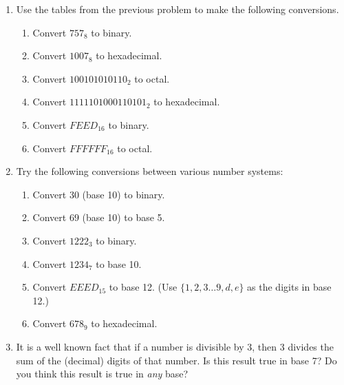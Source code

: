 \begin{enumerate}
{\vfill

}

\hintspagebreak
\workbookpagebreak
\textbookpagebreak

\item Use the tables from the previous problem to make the following conversions.

\begin{enumerate}
\item Convert $757_8$ to binary.
\item Convert $1007_8$ to hexadecimal.
\item Convert $100101010110_2$ to octal.
\item Convert $1111101000110101_2$ to hexadecimal.
\item Convert $FEED_{16}$ to binary.
\item Convert $FFFFFF_{16}$ to octal.
\end{enumerate}


\wbvfill

\item Try the following conversions between various number systems:

\begin{enumerate}
\item Convert $30$ (base 10) to binary.
\item Convert $69$ (base 10) to base 5.
\item Convert $1222_3$ to binary.
\item Convert $1234_7$ to base 10.
\item Convert $EEED_{15}$ to base 12. (Use $\{1, 2, 3 \ldots 9, d, e\}$ as the digits in base 12.)
\item Convert $678_{9}$ to hexadecimal.
\end{enumerate}

\wbvfill

\hintspagebreak
\workbookpagebreak

\item It is a well known fact that if a number is divisible by 3, then 3
  divides the sum of the (decimal) digits of that number.  Is this
  result true in base 7?  Do you think this result is true in {\em
  any} base? 
 
 \wbvfill
 


\end{enumerate}
